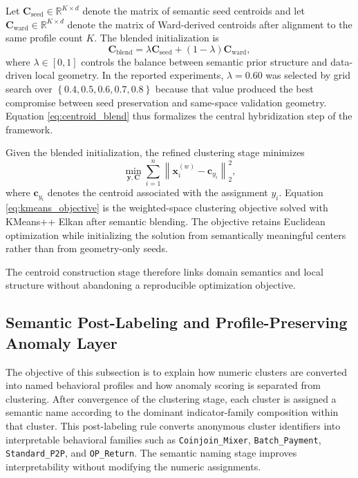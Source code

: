 \documentclass{ieeeaccess}
\begin{document}
Let $\mathbf{C}_{\text{seed}} \in \mathbb{R}^{K \times d}$ denote the matrix of semantic seed centroids and let $\mathbf{C}_{\text{ward}} \in \mathbb{R}^{K \times d}$ denote the matrix of Ward-derived centroids after alignment to the same profile count $K$. The blended initialization is
\begin{equation}
\mathbf{C}_{\text{blend}} = \lambda \mathbf{C}_{\text{seed}} + \left(1-\lambda\right)\mathbf{C}_{\text{ward}},
\label{eq:centroid_blend}
\end{equation}
where $\lambda \in [0,1]$ controls the balance between semantic prior structure and data-driven local geometry. In the reported experiments, $\lambda = 0.60$ was selected by grid search over $\left\{0.4,0.5,0.6,0.7,0.8\right\}$ because that value produced the best compromise between seed preservation and same-space validation geometry. Equation \eqref{eq:centroid_blend} thus formalizes the central hybridization step of the framework.

Given the blended initialization, the refined clustering stage minimizes
\begin{equation}
\min_{\mathbf{y},\mathbf{C}} \sum_{i=1}^{n} \left\| \mathbf{x}_i^{(w)} - \mathbf{c}_{y_i} \right\|_2^2,
\label{eq:kmeans_objective}
\end{equation}
where $\mathbf{c}_{y_i}$ denotes the centroid associated with the assignment $y_i$. Equation \eqref{eq:kmeans_objective} is the weighted-space clustering objective solved with KMeans++ Elkan after semantic blending. The objective retains Euclidean optimization while initializing the solution from semantically meaningful centers rather than from geometry-only seeds.

The centroid construction stage therefore links domain semantics and local structure without abandoning a reproducible optimization objective.

\subsection{Semantic Post-Labeling and Profile-Preserving Anomaly Layer}

The objective of this subsection is to explain how numeric clusters are converted into named behavioral profiles and how anomaly scoring is separated from clustering. After convergence of the clustering stage, each cluster is assigned a semantic name according to the dominant indicator-family composition within that cluster. This post-labeling rule converts anonymous cluster identifiers into interpretable behavioral families such as \texttt{Coinjoin\_Mixer}, \texttt{Batch\_Payment}, \texttt{Standard\_P2P}, and \texttt{OP\_Return}. The semantic naming stage improves interpretability without modifying the numeric assignments.
\end{document}
